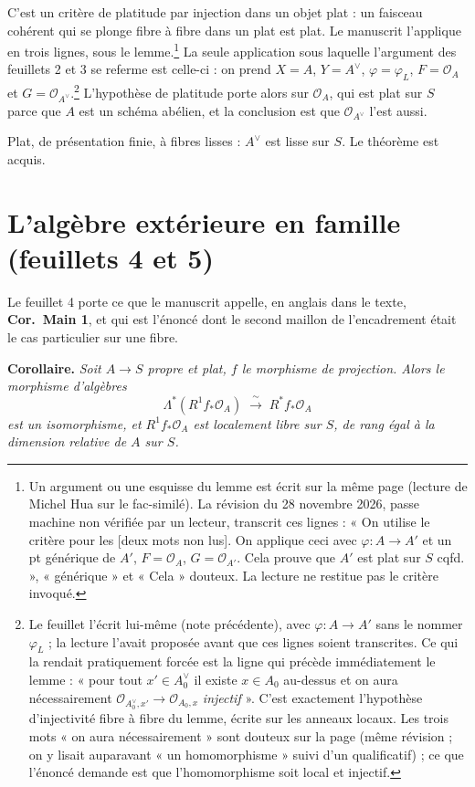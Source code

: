 \documentclass[11pt,a4paper]{article}
\begin{document}
C'est un critère de platitude par injection dans un objet plat : un faisceau
cohérent qui se plonge fibre à fibre dans un plat est plat. Le manuscrit
l'applique en trois lignes, sous le lemme.\footnote{Un argument ou une esquisse du lemme est écrit sur la même page (lecture de Michel Hua sur le fac-similé). La révision du 28 novembre 2026, passe machine non vérifiée par un lecteur, transcrit ces lignes : « On utilise le critère pour les [deux mots non lus]. On applique ceci avec $\varphi : A \to A'$ et un pt générique de $A'$, $F = \mathcal{O}_{A}$, $G = \mathcal{O}_{A'}$. Cela prouve que $A'$ est plat sur $S$ cqfd. », « générique » et « Cela » douteux. La lecture ne restitue pas le critère invoqué.} La seule
application sous laquelle l'argument des feuillets 2 et 3 se referme est
celle-ci : on prend $X = A$, $Y = A^{\vee}$, $\varphi = \varphi_{L}$,
$F = \mathcal{O}_{A}$ et $G = \mathcal{O}_{A^{\vee}}$.\footnote{Le feuillet
l'écrit lui-même (note précédente), avec $\varphi : A \to A'$ sans le nommer
$\varphi_{L}$ ; la lecture l'avait proposée avant que ces lignes soient
transcrites. Ce qui la rendait
pratiquement forcée est la ligne qui précède immédiatement le lemme :
« pour tout $x' \in A^{\vee}_{0}$ il existe $x \in A_{0}$ au-dessus et on aura
nécessairement $\mathcal{O}_{A^{\vee}_{0}, x'} \to \mathcal{O}_{A_{0}, x}$
\emph{injectif} ». C'est exactement l'hypothèse d'injectivité fibre à fibre du
lemme, écrite sur les anneaux locaux. Les trois mots « on aura nécessairement »
sont douteux sur la page (même révision ; on y lisait auparavant « un
homomorphisme » suivi d'un qualificatif) ; ce que l'énoncé demande est que
l'homomorphisme soit local et injectif.} L'hypothèse de platitude porte alors sur $\mathcal{O}_{A}$, qui est
plat sur $S$ parce que $A$ est un schéma abélien, et la conclusion est que
$\mathcal{O}_{A^{\vee}}$ l'est aussi.

Plat, de présentation finie, à fibres lisses : $A^{\vee}$ est lisse sur $S$.
Le théorème est acquis.

\section*{L'algèbre extérieure en famille (feuillets 4 et 5)}

Le feuillet 4 porte ce que le manuscrit appelle, en anglais dans le texte,
\textbf{Cor.\ Main 1}, et qui est l'énoncé dont le second maillon de
l'encadrement était le cas particulier sur une fibre.

\textbf{Corollaire.} \emph{Soit $A \to S$ propre et plat, $f$ le morphisme de
projection. Alors le morphisme d'algèbres}
\[
  \Lambda^{*}\!\left(R^{1}f_{*}\mathcal{O}_{A}\right)
  \;\xrightarrow{\ \sim\ }\; R^{*}f_{*}\mathcal{O}_{A}
\]
\emph{est un isomorphisme, et $R^{1}f_{*}\mathcal{O}_{A}$ est localement libre
sur $S$, de rang égal à la dimension relative de $A$ sur $S$.}
\end{document}
